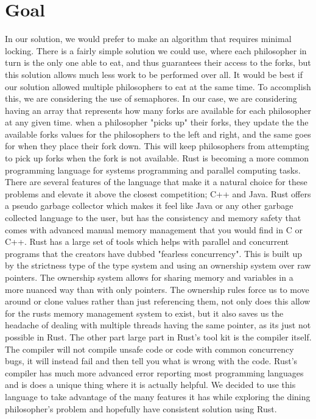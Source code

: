 \documentclass[conference]{IEEEtran}
\begin{document}
	 \section{Goal}
		In our solution, we would prefer to make an algorithm that requires minimal locking. There is a fairly simple solution we could use, where each philosopher in turn is the only one able to eat, and thus guarantees their access to the forks, but this solution allows much less work to be performed over all. It would be best if our solution allowed multiple philosophers to eat at the same time. To accomplish this, we are considering the use of semaphores. In our case, we are considering having an array that represents how many forks are available for each philosopher at any given time. when a philosopher "picks up" their forks, they update the the available forks values for the philosophers to the left and right, and the same goes for when they place their fork down. This will keep philosophers from attempting to pick up forks when the fork is not available. 
	\linebreak
    \linebreak
    Rust is becoming a more common programming language for systems programming and parallel computing tasks. There are several features of the language that make it a natural choice for these problems and elevate it above the closest competition; C++ and Java. Rust offers a pseudo garbage collector which makes it feel like Java or any other garbage collected language to the user, but has the consistency and memory safety that comes with advanced manual memory management that you would find in C or C++. Rust has a large set of tools which helps with parallel and concurrent programs that the creators have dubbed "fearless concurrency". This is built up by the strictness type of the type system and using an ownership system over raw pointers. The ownership system allows for sharing memory and variables in a more nuanced way than with only pointers. The ownership rules force us to move around or clone values rather than just referencing them, not only does this allow for the rusts memory management system to exist, but it also saves us the headache of dealing with multiple threads having the same pointer, as its just not possible in Rust. The other part large part in Rust's tool kit is the compiler itself. The compiler will not compile unsafe code or code with common concurrency bugs, it will instead fail and then tell you what is wrong with the code. Rust's compiler has much more advanced error reporting most programming languages and is does a unique thing where it is actually helpful. We decided to use this language to take advantage of the many features it has while exploring the dining philosopher's problem and hopefully have consistent solution using Rust.
\end{document}
